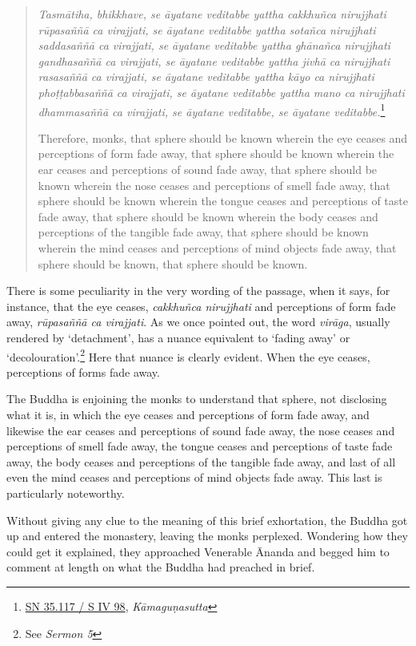 \begin{quote}
\emph{Tasmātiha, bhikkhave, se āyatane veditabbe yattha cakkhuñca nirujjhati rūpasaññā ca virajjati, se āyatane veditabbe yattha sotañca nirujjhati saddasaññā ca virajjati, se āyatane veditabbe yattha ghānañca nirujjhati gandhasaññā ca virajjati, se āyatane veditabbe yattha jivhā ca nirujjhati rasasaññā ca virajjati, se āyatane veditabbe yattha kāyo ca nirujjhati phoṭṭabbasaññā ca virajjati, se āyatane veditabbe yattha mano ca nirujjhati dhammasaññā ca virajjati, se āyatane veditabbe, se āyatane veditabbe.}\footnote{\href{https://suttacentral.net/sn35.117/pli/ms}{SN 35.117 / S IV 98}, \emph{Kāmaguṇasutta}}

Therefore, monks, that sphere should be known wherein the eye ceases and perceptions of form fade away, that sphere should be known wherein the ear ceases and perceptions of sound fade away, that sphere should be known wherein the nose ceases and perceptions of smell fade away, that sphere should be known wherein the tongue ceases and perceptions of taste fade away, that sphere should be known wherein the body ceases and perceptions of the tangible fade away, that sphere should be known wherein the mind ceases and perceptions of mind objects fade away, that sphere should be known, that sphere should be known.
\end{quote}

There is some peculiarity in the very wording of the passage, when it says, for instance, that the eye ceases, \emph{cakkhuñca nirujjhati} and perceptions of form fade away, \emph{rūpasaññā ca virajjati}. As we once pointed out, the word \emph{virāga}, usually rendered by `detachment', has a nuance equivalent to `fading away' or `decolouration'.\footnote{See \emph{Sermon 5}} Here that nuance is clearly evident. When the eye ceases, perceptions of forms fade away.

The Buddha is enjoining the monks to understand that sphere, not disclosing what it is, in which the eye ceases and perceptions of form fade away, and likewise the ear ceases and perceptions of sound fade away, the nose ceases and perceptions of smell fade away, the tongue ceases and perceptions of taste fade away, the body ceases and perceptions of the tangible fade away, and last of all even the mind ceases and perceptions of mind objects fade away. This last is particularly noteworthy.

Without giving any clue to the meaning of this brief exhortation, the Buddha got up and entered the monastery, leaving the monks perplexed. Wondering how they could get it explained, they approached Venerable Ānanda and begged him to comment at length on what the Buddha had preached in brief.

